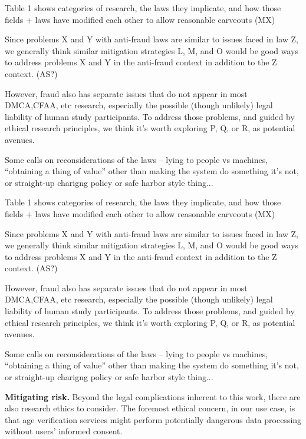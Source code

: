 \begin{outline}

\1 Table 1 shows categories of research, the laws they implicate, and how those fields + laws have modified each other to allow reasonable carveouts (MX)

\1 Since problems X and Y with anti-fraud laws are similar to issues faced in law Z, we generally think similar mitigation strategies L, M, and O would be good ways to address problems X and Y in the anti-fraud context in addition to the Z context. (AS?)

\1 However, fraud also has separate issues that do not appear in most DMCA,CFAA, etc research, especially the possible (though unlikely) legal liability of human study participants.  To address those problems, and guided by ethical research principles, we think it's worth exploring P, Q, or R, as potential avenues.

\1 Some calls on reconsiderations of the laws -- lying to people vs machines, ``obtaining a thing of value'' other than making the system do something it's not, or straight-up charigng policy or safe harbor style thing... 


\1 Table 1 shows categories of research, the laws they implicate, and how those fields + laws have modified each other to allow reasonable carveouts (MX)

\1 Since problems X and Y with anti-fraud laws are similar to issues faced in law Z, we generally think similar mitigation strategies L, M, and O would be good ways to address problems X and Y in the anti-fraud context in addition to the Z context. (AS?)

\1 However, fraud also has separate issues that do not appear in most DMCA,CFAA, etc research, especially the possible (though unlikely) legal liability of human study participants.  To address those problems, and guided by ethical research principles, we think it's worth exploring P, Q, or R, as potential avenues.

\1 Some calls on reconsiderations of the laws -- lying to people vs machines, ``obtaining a thing of value'' other than making the system do something it's not, or straight-up charigng policy or safe harbor style thing... 
\end{outline}


\textbf{Mitigating risk.} Beyond the legal complications inherent to this work, there are also research ethics to consider. 
The foremost ethical concern, in our use case, is that age verification services might perform potentially dangerous data processing without users' informed consent.


